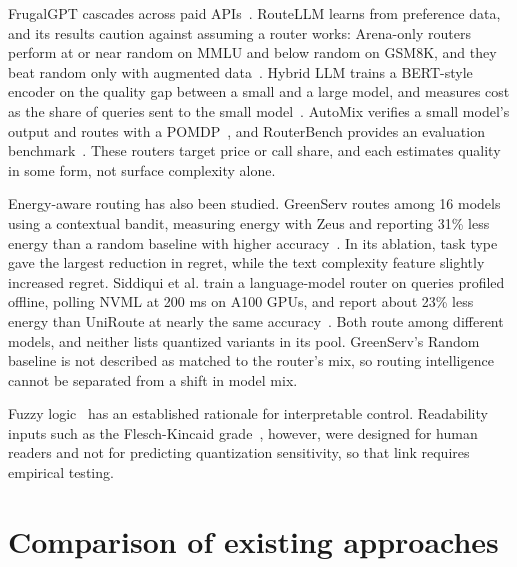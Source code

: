 FrugalGPT cascades across paid APIs~\cite{b28}. RouteLLM learns from preference data, and its results caution against assuming a router works: Arena-only routers perform at or near random on MMLU and below random on GSM8K, and they beat random only with augmented data~\cite{b29}. Hybrid LLM trains a BERT-style encoder on the quality gap between a small and a large model, and measures cost as the share of queries sent to the small model~\cite{b30}. AutoMix verifies a small model's output and routes with a POMDP~\cite{b31}, and RouterBench provides an evaluation benchmark~\cite{b32}. These routers target price or call share, and each estimates quality in some form, not surface complexity alone.

Energy-aware routing has also been studied. GreenServ routes among 16 models using a contextual bandit, measuring energy with Zeus and reporting 31\% less energy than a random baseline with higher accuracy~\cite{b48}. In its ablation, task type gave the largest reduction in regret, while the text complexity feature slightly increased regret. Siddiqui et al. train a language-model router on queries profiled offline, polling NVML at 200 ms on A100 GPUs, and report about 23\% less energy than UniRoute at nearly the same accuracy~\cite{b49}. Both route among different models, and neither lists quantized variants in its pool. GreenServ's Random baseline is not described as matched to the router's mix, so routing intelligence cannot be separated from a shift in model mix.

Fuzzy logic~\cite{b33,b34} has an established rationale for interpretable control. Readability inputs such as the Flesch-Kincaid grade~\cite{b35}, however, were designed for human readers and not for predicting quantization sensitivity, so that link requires empirical testing.

\section{Comparison of existing approaches}

